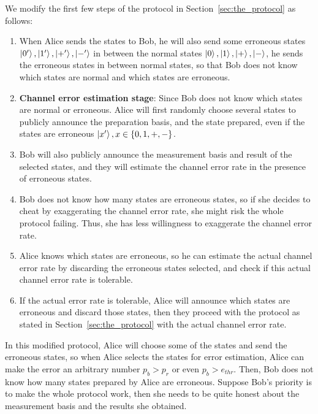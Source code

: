\documentclass[%
 reprint,
superscriptaddress,
 amsmath,amssymb,
 aps,
]{revtex4-2}
\begin{document}
We modify the first few steps of the protocol in Section~\ref{sec:the_protocol} as follows: 
\begin{enumerate}
    \item When Alice sends the states to Bob, he will also send some erroneous states $\ket{0'}, \ket{1'}, \ket{+'}, \ket{-'} $ in between the normal states $\ket{0}, \ket{1}, \ket{+}, \ket{-}$, he sends the erroneous states in between normal states, so that Bob does not know which states are normal and which states are erroneous.
    
    \item \textbf{Channel error estimation stage}: Since Bob does not know which states are normal or erroneous. Alice will first randomly choose several states to publicly announce the preparation basis, and the state prepared, even if the states are erroneous $\ket{x'}, x\in\{0, 1, +, -\}$.

    \item Bob will also publicly announce the measurement basis and result of the selected states, and they will estimate the channel error rate in the presence of erroneous states.

    \item Bob does not know how many states are erroneous states, so if she decides to cheat by exaggerating the channel error rate, she might risk the whole protocol failing. Thus, she has less willingness to exaggerate the channel error rate.

    \item Alice knows which states are erroneous, so he can estimate the actual channel error rate by discarding the erroneous states selected, and check if this actual channel error rate is tolerable.

    \item If the actual error rate is tolerable, Alice will announce which states are erroneous and discard those states, then they proceed with the protocol as stated in Section~\ref{sec:the_protocol} with the actual channel error rate.
\end{enumerate}

In this modified protocol, Alice will choose some of the states and send the erroneous states, so when Alice selects the states for error estimation, Alice can make the error an arbitrary number $p_b>p_r$ or even $p_b>e_{thr}$. Then, Bob does not know how many states prepared by Alice are erroneous. Suppose Bob's priority is to make the whole protocol work, then she needs to be quite honest about the measurement basis and the results she obtained. 
\end{document}
